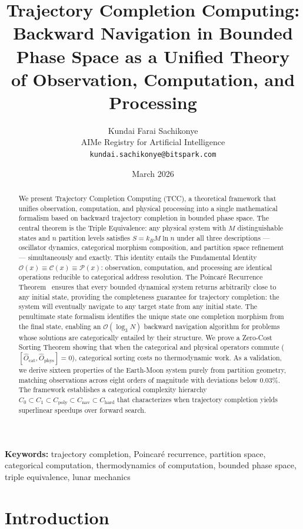 \documentclass[12pt,twocolumn]{article}
\title{\textbf{Trajectory Completion Computing:\\
Backward Navigation in Bounded Phase Space as a Unified Theory\\
of Observation, Computation, and Processing}}
\author{
Kundai Farai Sachikonye\\
AIMe Registry for Artificial Intelligence\\
\texttt{kundai.sachikonye@bitspark.com}
}
\date{March 2026}
\begin{document}
\maketitle

\begin{abstract}
We present Trajectory Completion Computing (TCC), a theoretical framework that unifies observation, computation, and physical processing into a single mathematical formalism based on backward trajectory completion in bounded phase space. The central theorem is the Triple Equivalence: any physical system with $M$ distinguishable states and $n$ partition levels satisfies $S = k_B M \ln n$ under all three descriptions --- oscillator dynamics, categorical morphism composition, and partition space refinement --- simultaneously and exactly. This identity entails the Fundamental Identity $\mathcal{O}(x) \equiv \mathcal{C}(x) \equiv \mathcal{P}(x)$: observation, computation, and processing are identical operations reducible to categorical address resolution. The Poincaré Recurrence Theorem~\cite{poincare1890probleme} ensures that every bounded dynamical system returns arbitrarily close to any initial state, providing the completeness guarantee for trajectory completion: the system will eventually navigate to any target state from any initial state. The penultimate state formalism identifies the unique state one completion morphism from the final state, enabling an $\mathcal{O}(\log_3 N)$ backward navigation algorithm for problems whose solutions are categorically entailed by their structure. We prove a Zero-Cost Sorting Theorem showing that when the categorical and physical operators commute ($[\hat{O}_{\text{cat}}, \hat{O}_{\text{phys}}] = 0$), categorical sorting costs no thermodynamic work. As a validation, we derive sixteen properties of the Earth-Moon system purely from partition geometry, matching observations across eight orders of magnitude with deviations below $0.03\%$. The framework establishes a categorical complexity hierarchy $C_0 \subset C_1 \subset C_{\text{poly}} \subset C_{\text{nav}} \subset C_{\text{hard}}$ that characterizes when trajectory completion yields superlinear speedups over forward search.
\end{abstract}

\textbf{Keywords:} trajectory completion, Poincaré recurrence, partition space, categorical computation, thermodynamics of computation, bounded phase space, triple equivalence, lunar mechanics

\section{Introduction}
\label{sec:introduction}
\end{document}

